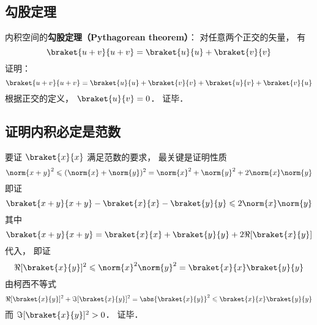 \subsection{勾股定理}
内积空间的\textbf{勾股定理（Pythagorean theorem）}： 对任意两个正交的矢量， 有
\begin{equation}\label{InerPd_eq1}
\braket{u + v}{u + v} = \braket{u}{u} + \braket{v}{v}
\end{equation}
证明：
\begin{equation}
\braket{u + v}{u + v} = \braket{u}{u} + \braket{v}{v} + \braket{u}{v} + \braket{v}{u}
\end{equation}
根据正交的定义， $\braket{u}{v} = 0$． 证毕．

\subsection{证明内积必定是范数}
要证 $\braket{x}{x}$ 满足范数的要求， 最关键是证明性质
\begin{equation}
\norm{x+y}^2 \leqslant (\norm{x} + \norm{y})^2 = \norm{x}^2 + \norm{y}^2 + 2\norm{x}\norm{y}
\end{equation}
即证
\begin{equation}
\braket{x+y}{x+y} - \braket{x}{x} - \braket{y}{y} \leqslant 2\norm{x}\norm{y}
\end{equation}
其中
\begin{equation}
\braket{x+y}{x+y} = \braket{x}{x} + \braket{y}{y} + 2\Re[{\braket{x}{y}}]
\end{equation}
代入， 即证
\begin{equation}\label{InerPd_eq5}
\Re[{\braket{x}{y}}]^2 \leqslant \norm{x}^2\norm{y}^2 = \braket{x}{x}\braket{y}{y}
\end{equation}
由柯西不等式
\begin{equation}
\Re[\braket{x}{y}]^2 + \Im[\braket{x}{y}]^2 = \abs{\braket{x}{y}}^2 \leqslant \braket{x}{x}\braket{y}{y}
\end{equation}
而 $\Im[\braket{x}{y}]^2 > 0$． 证毕．
